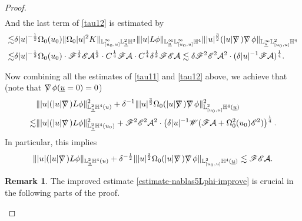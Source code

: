 \documentclass[11pt,reqno]{amsart}
\theoremstyle{definition}
\newtheorem{remark}{Remark}[section]
\numberwithin{equation}{section}
\renewcommand{\L}{\mathbb{L}}
\renewcommand{\H}{\mathbb{H}}
\def\ub{\underline{u}}
\def\nablas{\mbox{$\nabla \mkern -13mu /$ }}
\begin{document}
\begin{proof}
\begin{align*}
\end{align*}
And the last term of \eqref{tau12} is estimated by
\begin{align*}
\lesssim&\delta|u|^{-\frac{1}{2}}\Omega_0(u_0)\|\Omega_0|u|^2K\|_{\L^\infty_{[u_0,u]}\L^2_{\ub}\H^3}\||u|L\phi\|_{\L^\infty_{\ub}\L^\infty_{[u_0,u]}\H^4}\||u|^\frac{3}{2}(|u|\nablas)\nablas\phi\|_{\L^\infty_{\ub}\L^2_{[u_0,u]}\H^4}\\
\lesssim&\delta|u|^{-\frac{1}{2}}\Omega_0(u_0)\cdot \mathscr{F}^{\frac{1}{2}}\mathscr{E}\mathcal{A}^{\frac{1}{2}}\cdot C^{\frac{1}{4}}\mathscr{F}\mathcal{A}\cdot C^{\frac{1}{4}}\delta^{\frac{1}{2}}\mathscr{F}\mathscr{E}\mathcal{A}\lesssim \delta\mathscr{F}^2\mathscr{E}^2\mathcal{A}^2\cdot(\delta|u|^{-1}\mathscr{F}\mathcal{A})^{\frac{1}{4}}.
\end{align*}


Now combining all the estimates of \eqref{tau11} and \eqref{tau12} above, we achieve that (note that $\nablas\phi(\ub=0)=0$)
\begin{equation}\label{estimate-nablas5Lphi-improve}
\begin{split}
&\||u|(|u|\nablas)L\phi\|_{\L^2_{\ub}\H^4(u)}^2+\delta^{-1}\||u|^{\frac{3}{2}}\Omega_0(|u|\nablas)\nablas\phi\|_{\L^2_{[u_0,u]}\H^4(\ub)}^2\\
\lesssim&\||u|(|u|\nablas)L\phi\|_{\L^2_{\ub}\H^4(u_0)}^2+\mathscr{F}^2\mathscr{E}^2\mathcal{A}^2\cdot\left(\delta|u|^{-1}\mathscr{W}(\mathscr{F}\mathcal{A}+\Omega_0^2(u_0)\mathscr{E}^2)\right)^{\frac{1}{4}}.
\end{split}
\end{equation}
In particular, this implies
\begin{equation}\label{estimate-nablas5Lphi}
\||u|(|u|\nablas)L\phi\|_{\L^2_{\ub}\H^4(u)}+\delta^{-\frac{1}{2}}\||u|^{\frac{3}{2}}\Omega_0(|u|\nablas)\nablas\phi\|_{\L^2_{[u_0,u]}\H^4(\ub)}\lesssim\mathscr{F}\mathscr{E}\mathcal{A}.
\end{equation}
\begin{remark}
The improved estimate \eqref{estimate-nablas5Lphi-improve} is crucial in the following parts of the proof.
\end{remark}



\end{proof}
\end{document}
